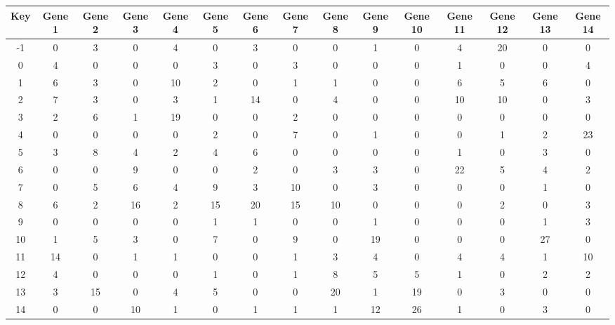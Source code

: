 \begin{tabular}{|c|c|c|c|c|c|c|c|c|c|c|c|c|c|c|}
\hline
Key & Gene 1 & Gene 2 & Gene 3 & Gene 4 & Gene 5 & Gene 6 & Gene 7 & Gene 8 & Gene 9 & Gene 10 & Gene 11 & Gene 12 & Gene 13 & Gene 14 \\
\hline
-1 & 0 & 3 & 0 & 4 & 0 & 3 & 0 & 0 & 1 & 0 & 4 & 20 & 0 & 0 \\
0 & 4 & 0 & 0 & 0 & 3 & 0 & 3 & 0 & 0 & 0 & 1 & 0 & 0 & 4 \\
1 & 6 & 3 & 0 & 10 & 2 & 0 & 1 & 1 & 0 & 0 & 6 & 5 & 6 & 0 \\
2 & 7 & 3 & 0 & 3 & 1 & 14 & 0 & 4 & 0 & 0 & 10 & 10 & 0 & 3 \\
3 & 2 & 6 & 1 & 19 & 0 & 0 & 2 & 0 & 0 & 0 & 0 & 0 & 0 & 0 \\
4 & 0 & 0 & 0 & 0 & 2 & 0 & 7 & 0 & 1 & 0 & 0 & 1 & 2 & 23 \\
5 & 3 & 8 & 4 & 2 & 4 & 6 & 0 & 0 & 0 & 0 & 1 & 0 & 3 & 0 \\
6 & 0 & 0 & 9 & 0 & 0 & 2 & 0 & 3 & 3 & 0 & 22 & 5 & 4 & 2 \\
7 & 0 & 5 & 6 & 4 & 9 & 3 & 10 & 0 & 3 & 0 & 0 & 0 & 1 & 0 \\
8 & 6 & 2 & 16 & 2 & 15 & 20 & 15 & 10 & 0 & 0 & 0 & 2 & 0 & 3 \\
9 & 0 & 0 & 0 & 0 & 1 & 1 & 0 & 0 & 1 & 0 & 0 & 0 & 1 & 3 \\
10 & 1 & 5 & 3 & 0 & 7 & 0 & 9 & 0 & 19 & 0 & 0 & 0 & 27 & 0 \\
11 & 14 & 0 & 1 & 1 & 0 & 0 & 1 & 3 & 4 & 0 & 4 & 4 & 1 & 10 \\
12 & 4 & 0 & 0 & 0 & 1 & 0 & 1 & 8 & 5 & 5 & 1 & 0 & 2 & 2 \\
13 & 3 & 15 & 0 & 4 & 5 & 0 & 0 & 20 & 1 & 19 & 0 & 3 & 0 & 0 \\
14 & 0 & 0 & 10 & 1 & 0 & 1 & 1 & 1 & 12 & 26 & 1 & 0 & 3 & 0 \\
\hline
\end{tabular}